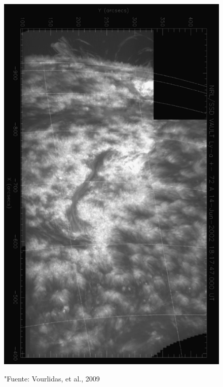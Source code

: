 \documentclass[9pt]{book}
\begin{document}
\begin{figure}[h]
\caption{"Fuente: Vourlidas, et al., 2009}
\centering
\includegraphics[scale=0.6]{vault_complete}
\label{fig:vault_complete}
\end{figure}
\end{document}
